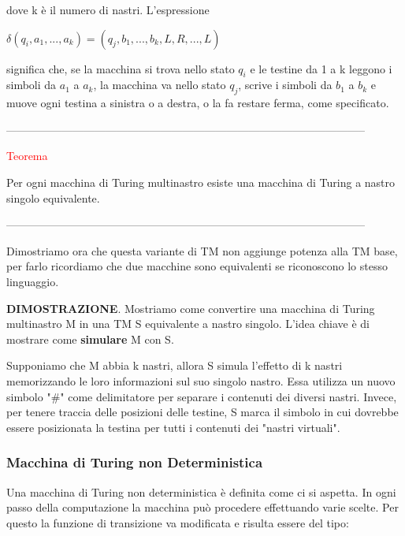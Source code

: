 \documentclass{article}
\begin{document}
dove k è il numero di nastri. L'espressione

\begin{center}
    $\delta(q_i, a_1, ..., a_k) = (q_j, b_1, ..., b_k, L, R, ..., L)$ 
\end{center}

significa che, se la macchina si trova nello stato $q_i$ e le testine da 1 a k leggono i simboli da $a_1$ a $a_k$, la macchina va nello stato $q_j$, scrive i simboli da $b_1$ a $b_k$ e muove ogni testina a sinistra o a destra, o la fa restare ferma, come specificato.

\newpage

--------------------------------------------------------------------------------------------------

\begin{center}
    \textcolor{red}{Teorema}
\end{center}

Per ogni macchina di Turing multinastro esiste una macchina di Turing a nastro singolo equivalente.

--------------------------------------------------------------------------------------------------

Dimostriamo ora che questa variante di TM non aggiunge potenza alla TM base, per farlo ricordiamo che due macchine sono equivalenti se riconoscono lo stesso linguaggio.

\textbf{DIMOSTRAZIONE}. Mostriamo come convertire una macchina di Turing multinastro M in una TM S equivalente a nastro singolo. L'idea chiave è di mostrare come \textbf{simulare} M con S.

Supponiamo che M abbia k nastri, allora S simula l'effetto di k nastri memorizzando le loro informazioni sul suo singolo nastro. Essa utilizza un nuovo simbolo "\#" come delimitatore per separare i contenuti dei diversi nastri. Invece, per tenere traccia delle posizioni delle testine, S marca il simbolo in cui dovrebbe essere posizionata la testina per tutti i contenuti dei "nastri virtuali".

\subsubsection{Macchina di Turing non Deterministica}

Una macchina di Turing non deterministica è definita come ci si aspetta. In ogni passo della computazione la macchina può procedere effettuando varie scelte. Per questo la funzione di transizione va modificata e risulta essere del tipo:
\end{document}
